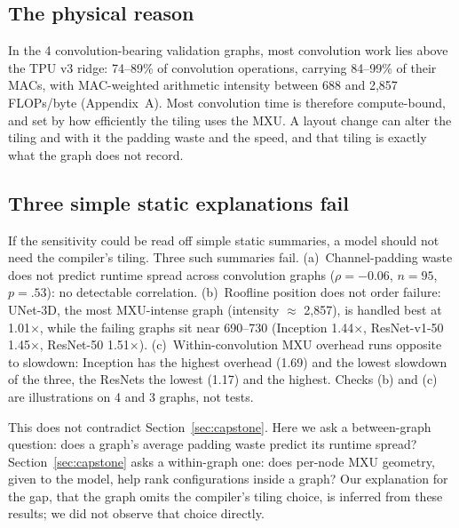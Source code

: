\subsection{The physical reason}
\label{sec:physical}
In the 4 convolution-bearing validation graphs, most convolution work lies above the TPU v3 ridge:
74--89\% of convolution operations, carrying 84--99\% of their MACs, with MAC-weighted arithmetic
intensity between 688 and 2,857 FLOPs/byte (Appendix~A). Most convolution time is therefore
compute-bound, and set by how efficiently the tiling uses the MXU. A layout change can alter the tiling
and with it the padding waste and the speed, and that tiling is exactly what the graph does not record.

\subsection{Three simple static explanations fail}
\label{sec:static-fail}
If the sensitivity could be read off simple static summaries, a model should not need the compiler's
tiling. Three such summaries fail. (a)~Channel-padding waste does not predict runtime spread across
convolution graphs ($\rho = -0.06$, $n = 95$, $p = .53$): no detectable correlation. (b)~Roofline
position does not order failure: UNet-3D, the most MXU-intense graph (intensity $\approx$ 2,857), is
handled best at 1.01$\times$, while the failing graphs sit near 690--730 (Inception 1.44$\times$,
ResNet-v1-50 1.45$\times$, ResNet-50 1.51$\times$). (c)~Within-convolution MXU overhead runs opposite
to slowdown: Inception has the highest overhead (1.69) and the lowest slowdown of the three, the
ResNets the lowest (1.17) and the highest. Checks (b) and (c) are illustrations on 4 and 3 graphs, not
tests.

This does not contradict Section~\ref{sec:capstone}. Here we ask a between-graph question: does a
graph's average padding waste predict its runtime spread? Section~\ref{sec:capstone} asks a
within-graph one: does per-node MXU geometry, given to the model, help rank configurations inside a
graph? Our explanation for the gap, that the graph omits the compiler's tiling choice, is inferred from
these results; we did not observe that choice directly.
